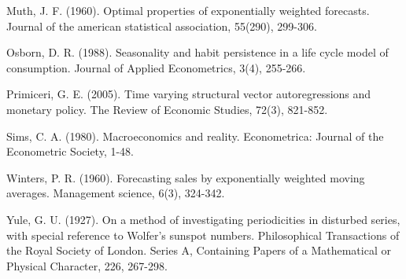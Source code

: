 \begin{thebibliography}{99}
Muth, J. F. (1960). Optimal properties of exponentially weighted forecasts. Journal of the american statistical association, 55(290), 299-306.

Osborn, D. R. (1988). Seasonality and habit persistence in a life cycle model of consumption. Journal of Applied Econometrics, 3(4), 255-266.

Primiceri, G. E. (2005). Time varying structural vector autoregressions and monetary policy. The Review of Economic Studies, 72(3), 821-852.

Sims, C. A. (1980). Macroeconomics and reality. Econometrica: Journal of the Econometric Society, 1-48.

Winters, P. R. (1960). Forecasting sales by exponentially weighted moving averages. Management science, 6(3), 324-342.

Yule, G. U. (1927). On a method of investigating periodicities in disturbed series, with special reference to Wolfer's sunspot numbers. Philosophical Transactions of the Royal Society of London. Series A, Containing Papers of a Mathematical or Physical Character, 226, 267-298.


\end{thebibliography}
